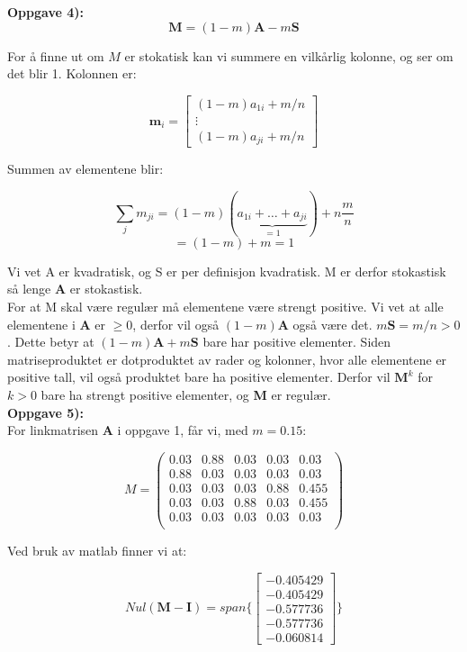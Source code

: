 \documentclass[a4paper,norsk,11pt,twoside]{article}
\begin{document}
\textbf{Oppgave 4):}\\

$$
\textbf{M} = (1-m)\textbf{A} - m\textbf{S}
$$

For å finne ut om $M$ er stokatisk kan vi summere en vilkårlig kolonne, og ser om det blir 1. Kolonnen er:

$$
\textbf{m}_i =
\begin{bmatrix}
(1-m)a_{1i} + m/n\\ \vdots \\ (1-m)a_{ji} + m/n
\end{bmatrix}
$$

Summen av elementene blir:

$$
\sum_j m_{ji} =  (1-m)(\underbrace{a_{1i} + \ldots + a_{ji}}_{=1}) + n\frac{m}{n}
$$
$$
= (1-m) + m = 1
$$

Vi vet A er kvadratisk, og S er per definisjon kvadratisk. M er derfor stokastisk så lenge \textbf{A} er stokastisk.\\

For at M skal være regulær må elementene være strengt positive. Vi vet at alle elementene i \textbf{A} er $\geq 0$, derfor vil også $(1-m)\textbf{A}$ også være det. $m\textbf{S} = m/n > 0$. Dette betyr at $(1-m)\textbf{A} + m\textbf{S}$ bare har positive elementer. Siden matriseproduktet er dotproduktet av rader og kolonner, hvor alle elementene er positive tall, vil også produktet bare ha positive elementer. Derfor vil $\textbf{M}^{k}$ for $k>0$ bare ha strengt positive elementer, og \textbf{M} er regulær.\\

\textbf{Oppgave 5):}\\

For linkmatrisen \textbf{A} i oppgave 1, får vi, med $m = 0.15$:

$$
M = 
\begin{pmatrix}
0.03 & 0.88 & 0.03 & 0.03 & 0.03\\
0.88 & 0.03 & 0.03 & 0.03 & 0.03\\
0.03 & 0.03 & 0.03 & 0.88 & 0.455\\
0.03 & 0.03 & 0.88 & 0.03 & 0.455\\
0.03 & 0.03 & 0.03 & 0.03 & 0.03\\
\end{pmatrix}
$$

Ved bruk av matlab finner vi at:

$$
Nul(\textbf{M} - \textbf{I}) = span\{ \begin{bmatrix}
-0.405429 \\ -0.405429 \\ -0.577736 \\ -0.577736 \\ -0.060814
\end{bmatrix} \}
$$
\end{document}
